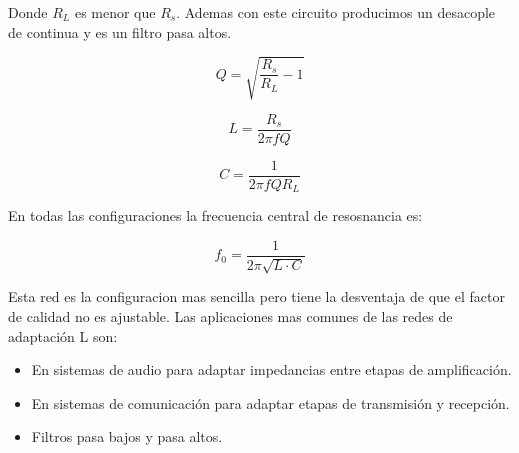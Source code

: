 Donde $R_L$ es menor que $R_s$. Ademas con este circuito producimos un desacople de continua y es un filtro pasa altos.


\begin{equation}
    Q = \sqrt{\frac{R_s}{R_L}-1}
\end{equation}

\begin{equation}
    L = \frac{R_s}{2 \pi f Q}
\end{equation}

\begin{equation}
    C = \frac{1}{2 \pi f Q R_L}
\end{equation}


En todas las configuraciones la frecuencia central de resosnancia es:

\begin{equation}
    f_0 = \frac{1}{2 \pi \sqrt{L \cdot C}}
\end{equation}

Esta red es la configuracion mas sencilla pero tiene la desventaja de que el factor de calidad no es ajustable. Las aplicaciones mas comunes de las redes de 
adaptación L son:

\begin{itemize}
    \item En sistemas de audio para adaptar impedancias entre etapas de amplificación.
    \item En sistemas de comunicación para adaptar etapas de transmisión y recepción.
    \item Filtros pasa bajos y pasa altos.
\end{itemize}


